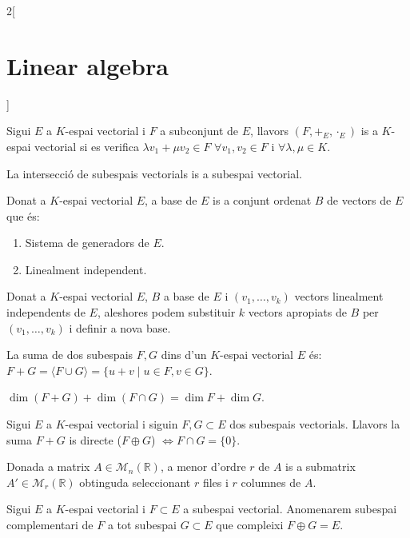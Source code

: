 \documentclass[../../../main.tex]{subfiles}
\begin{document}
\begin{multicols}{2}[\section{Linear algebra}]
\begin{definition}
\begin{enumerate}
    \end{enumerate}
\end{definition}
\begin{definition}
Sigui $E$ a $K$-espai vectorial i $F$ a subconjunt de $E$, llavors $(F,+_E,\cdot_E)$ is a $K$-espai vectorial si es verifica $\lambda v_1+\mu v_2\in F$ $\forall v_1,v_2\in F$ i $\forall\lambda,\mu\in K$.
\end{definition}
\begin{lemma}
La intersecció de subespais vectorials is a subespai vectorial.
\end{lemma}
\begin{definition}
Donat a $K$-espai vectorial $E$, a base de $E$ is a conjunt ordenat $B$ de vectors de $E$ que és: 
\begin{enumerate}
    \item Sistema de generadors de $E$.
    \item Linealment independent.
\end{enumerate}
\end{definition}
\begin{theorem}
Donat a $K$-espai vectorial $E$, $B$ a base de $E$ i $(v_1,\ldots,v_k)$ vectors linealment independents de $E$, aleshores podem substituir $k$ vectors apropiats de $B$ per $(v_1,\ldots,v_k)$ i definir a nova base.
\end{theorem}
\begin{definition}
La suma de dos subespais $F,G$ dins d'un $K$-espai vectorial $E$ és: $F+G=\langle F\cup G\rangle=\{u+v\mid u\in F,v\in G\}$.
\end{definition}
\begin{prop}
$\dim (F+G)+\dim(F\cap G)=\dim F+\dim G$.
\end{prop}
\begin{definition}
Sigui $E$ a $K$-espai vectorial i siguin $F,G\subset E$ dos subespais vectorials. Llavors la suma $F+G$ is directe ($F\oplus G$) $\iff F\cap G=\{0\}$.
\end{definition}
\begin{definition}
Donada a matrix $A\in\mathcal{M}_n(\mathbb{R})$, a menor d'ordre $r$ de $A$ is a submatrix $A'\in\mathcal{M}_r(\mathbb{R})$ obtinguda seleccionant $r$ files i $r$ columnes de $A$.
\end{definition}
\begin{definition}
Sigui $E$ a $K$-espai vectorial i $F\subset E$ a subespai vectorial. Anomenarem subespai complementari de $F$ a tot subespai $G\subset E$ que compleixi $F\oplus G=E$.

\end{definition}
\end{multicols}
\end{document}
